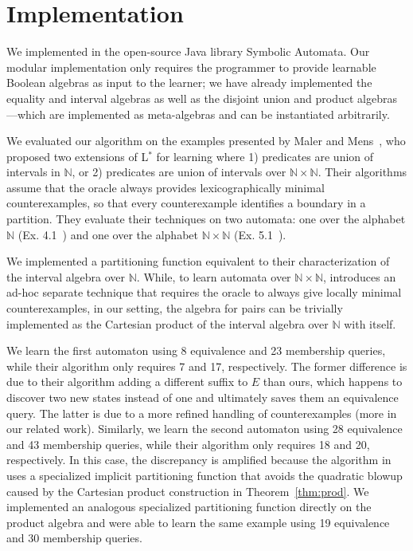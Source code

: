 \section{Implementation}
\label{sec:implementation}

We implemented \alg in the open-source Java library
Symbolic Automata.
Our modular implementation only requires the programmer to provide
learnable Boolean algebras as input to the learner;
we have already implemented the equality and interval algebras
as well as the disjoint union and product algebras---which
are implemented as meta-algebras and can be instantiated arbitrarily.

We evaluated our algorithm on the examples  presented by
Maler and Mens~\cite{mens15}, who
proposed two extensions of L$^*$
for learning \SFAs where 1) predicates are
union of intervals in $\mathbb{N}$, or
2) predicates are
union of intervals over $\mathbb{N}\times \mathbb{N}$.
Their algorithms  assume that the oracle always provides lexicographically minimal counterexamples,
so that every counterexample identifies a boundary in a partition.
They evaluate their techniques on two automata: one over 
the alphabet $\mathbb{N}$ (Ex. 4.1~\cite{mens15})  and one over the alphabet $\mathbb{N} \times \mathbb{N}$
(Ex. 5.1~\cite{mens15}).

We implemented a partitioning function equivalent to their characterization
of the interval algebra over $\mathbb{N}$.
While, to learn automata over $\mathbb{N} \times \mathbb{N}$,
\cite{mens15} introduces an ad-hoc separate technique that  requires the oracle
to always give locally minimal counterexamples,
in our setting, the algebra for pairs can be trivially implemented as
the Cartesian product of the interval algebra over $\mathbb{N}$ with itself.

We learn the first automaton using 8 equivalence and 23 membership queries,
while their algorithm only requires 7 and 17, respectively.
The former difference is due to their algorithm adding a different suffix
to $E$ than ours, which happens to discover two new states instead of one
and ultimately saves them an equivalence query.
The latter is due to a more refined handling of counterexamples (more in our related work).
Similarly,  we learn the second 
automaton using 28 equivalence and 43 membership queries,
while their algorithm only requires
18 and 20, respectively.
In this case, the discrepancy is amplified because
the algorithm in~\cite{mens15} uses a specialized
implicit partitioning function that avoids the quadratic
blowup caused by the Cartesian product construction
in Theorem~\ref{thm:prod}.
We implemented an analogous specialized partitioning function
directly on the product algebra and were able to learn the same example using
19 equivalence and 30 membership queries.


